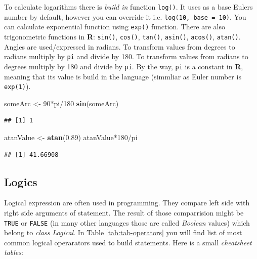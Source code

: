\documentclass[]{book}
\newenvironment{Shaded}{\begin{snugshade}}{\end{snugshade}}
\newcommand{\KeywordTok}[1]{\textcolor[rgb]{0.12,0.11,0.11}{\textbf{#1}}}
\newcommand{\DecValTok}[1]{\textcolor[rgb]{0.69,0.50,0.00}{#1}}
\newcommand{\FloatTok}[1]{\textcolor[rgb]{0.69,0.50,0.00}{#1}}
\newcommand{\StringTok}[1]{\textcolor[rgb]{0.75,0.01,0.01}{#1}}
\newcommand{\OperatorTok}[1]{\textcolor[rgb]{0.12,0.11,0.11}{#1}}
\newcommand{\NormalTok}[1]{\textcolor[rgb]{0.12,0.11,0.11}{#1}}
\theoremstyle{definition}
\theoremstyle{definition}
\theoremstyle{definition}
\theoremstyle{remark}
\begin{document}
To calculate logarithms there is \emph{build in} function
\texttt{log()}. It uses as a base Eulers number by default, however you
can override it i.e. \texttt{log(10,\ base\ =\ 10)}. You can calculate
exponential function using \texttt{exp()} function. There are also
trigonometric functions in \textbf{R}: \texttt{sin()}, \texttt{cos()},
\texttt{tan()}, \texttt{asin()}, \texttt{acos()}, \texttt{atan()}.
Angles are used/expressed in radians. To transform values from degrees
to radians multiply by \texttt{pi} and divide by 180. To transform
values from radians to degrees multiply by 180 and divide by
\texttt{pi}. By the way, \texttt{pi} is a constant in \textbf{R},
meaning that its value is build in the language (simmliar as Euler
number is \texttt{exp(1)}).

\begin{Shaded}
\begin{Highlighting}[]
\NormalTok{someArc <-}\StringTok{ }\DecValTok{90}\OperatorTok{*}\NormalTok{pi}\OperatorTok{/}\DecValTok{180}
\KeywordTok{sin}\NormalTok{(someArc)}
\end{Highlighting}
\end{Shaded}

\begin{verbatim}
## [1] 1
\end{verbatim}

\begin{Shaded}
\begin{Highlighting}[]
\NormalTok{atanValue <-}\StringTok{ }\KeywordTok{atan}\NormalTok{(}\FloatTok{0.89}\NormalTok{)}
\NormalTok{atanValue}\OperatorTok{*}\DecValTok{180}\OperatorTok{/}\NormalTok{pi}
\end{Highlighting}
\end{Shaded}

\begin{verbatim}
## [1] 41.66908
\end{verbatim}

\subsection{Logics}\label{logics}

Logical expression are often used in programming. They compare left side
with right side arguments of statement. The result of those comparrision
might be \texttt{TRUE} or \texttt{FALSE} (in many other languages those
are called \emph{Boolean} values) which belong to \emph{class Logical}.
In Table \ref{tab:tab-operators} you will find list of most common
logical operarators used to build statements. Here is a small
\emph{cheatsheet tables}:
\end{document}
